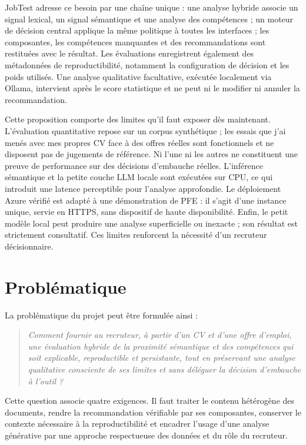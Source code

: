 JobTest adresse ce besoin par une chaîne unique : une analyse hybride associe un signal lexical, un signal sémantique et une analyse des compétences ; un moteur de décision central applique la même politique à toutes les interfaces ; les composantes, les compétences manquantes et des recommandations sont restituées avec le résultat. Les évaluations enregistrent également des métadonnées de reproductibilité, notamment la configuration de décision et les poids utilisés. Une analyse qualitative facultative, exécutée localement via Ollama, intervient après le score statistique et ne peut ni le modifier ni annuler la recommandation.

Cette proposition comporte des limites qu'il faut exposer dès maintenant. L'évaluation quantitative repose sur un corpus synthétique ; les essais que j'ai menés avec mes propres CV face à des offres réelles sont fonctionnels et ne disposent pas de jugements de référence. Ni l'une ni les autres ne constituent une preuve de performance sur des décisions d'embauche réelles. L'inférence sémantique et la petite couche LLM locale sont exécutées sur CPU, ce qui introduit une latence perceptible pour l'analyse approfondie. Le déploiement Azure vérifié est adapté à une démonstration de PFE : il s'agit d'une instance unique, servie en HTTPS, sans dispositif de haute disponibilité. Enfin, le petit modèle local peut produire une analyse superficielle ou inexacte ; son résultat est strictement consultatif. Ces limites renforcent la nécessité d'un recruteur décisionnaire.

\section{Problématique}
La problématique du projet peut être formulée ainsi :

\begin{quote}
\emph{Comment fournir au recruteur, à partir d'un CV et d'une offre d'emploi, une évaluation hybride de la proximité sémantique et des compétences qui soit explicable, reproductible et persistante, tout en préservant une analyse qualitative consciente de ses limites et sans déléguer la décision d'embauche à l'outil ?}
\end{quote}

Cette question associe quatre exigences. Il faut traiter le contenu hétérogène des documents, rendre la recommandation vérifiable par ses composantes, conserver le contexte nécessaire à la reproductibilité et encadrer l'usage d'une analyse générative par une approche respectueuse des données et du rôle du recruteur.

